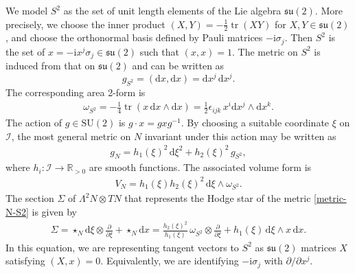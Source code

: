 \documentclass[pdftex]{sigma}
\newcommand{\II}{{\mathcal{I}}}
\newcommand{\su}{{\mathfrak{su}}}
\newcommand{\SU}{{\mathrm{SU}}}
\newcommand{\ii}{{\mathrm{i}}}
\newcommand{\R}{{\mathbb{R}}}
\newcommand{\1}{{\mathbb{1}}}
\newcommand{\bdy}{\partial}
\def \d{\mathrm{d}}
\newcommand{\tr}{{\operatorname{tr}}}
\numberwithin{equation}{section}
\begin{document}
We model $S^2$ as the set of unit length elements of the Lie algebra $\su(2)$. More precisely, we choose the inner product $(X,Y)=-\tfrac{1}{2}\tr(XY)$ for $X, Y\in\su(2)$, and choose the orthonormal basis defined by Pauli matrices $-\ii\sigma_j$. Then $S^2$ is the set of $x=-\ii x^j\sigma_j\in\su(2)$ such that $(x,x)=1$. The metric on $S^2$ is induced from that on $\su(2)$ and can be written as
\begin{equation*}
g_{S^2}=(\d x,\d x)=\d x^j\,\d x^j.
\end{equation*}
The corresponding area 2-form is
\begin{align*}
\omega_{S^2}=-\tfrac{1}{4}\tr(x\,\d x\wedge\d x)=\tfrac{1}{2}\epsilon_{ijk}\, x^i\d x^j\wedge\d x^k.
\end{align*}
The action of $g\in \SU(2)$ is $g\cdot x = gxg^{-1}$. By choosing a suitable coordinate $\xi$ on $\II$, the most general metric on $N$ invariant under this action may be written as
\begin{align}
 g_N=h_1(\xi)^2\,\d\xi^2+h_2(\xi)^2\,g_{S^2},\label{metric-N-S2}
\end{align}
where $h_i\colon \II\to\R_{>0}$ are smooth functions. The associated volume form is
\begin{align}
\label{adjoint-nu}
 V_N=h_1(\xi)h_2(\xi)^2\,\d\xi\wedge\omega_{S^2}.
\end{align}
The section $\Sigma$ of $\Lambda^2 N\otimes TN$ that represents the Hodge star of the metric \eqref{metric-N-S2} is given by
\begin{align}
\label{adjoint-Sigma}
\Sigma = \star_{N} \d \xi\otimes\frac{\bdy}{\bdy \xi} + \star_{N}\d x = \frac{h_2(\xi)^2}{h_1(\xi)}\,\omega_{S^2}\otimes\frac{\bdy}{\bdy \xi} + h_1(\xi)\,\d\xi\wedge x\, \d x.
\end{align}
In this equation, we are representing tangent vectors to $S^2$ as $\su(2)$ matrices $X$ satisfying $(X,x)=0$. Equivalently, we are identifying $-\ii\sigma_j$ with $\bdy/\bdy x^j$.
\end{document}
